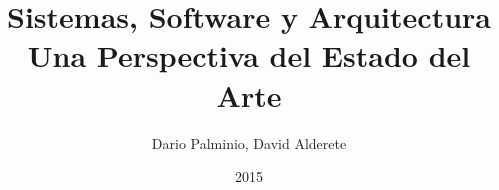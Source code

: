 
\title{\Huge 
    \textbf{Sistemas, Software y Arquitectura}  \\ 
    \huge Una Perspectiva del Estado del Arte
    }

\author{Dario Palminio, David Alderete}

\date{2015} 

\maketitle

